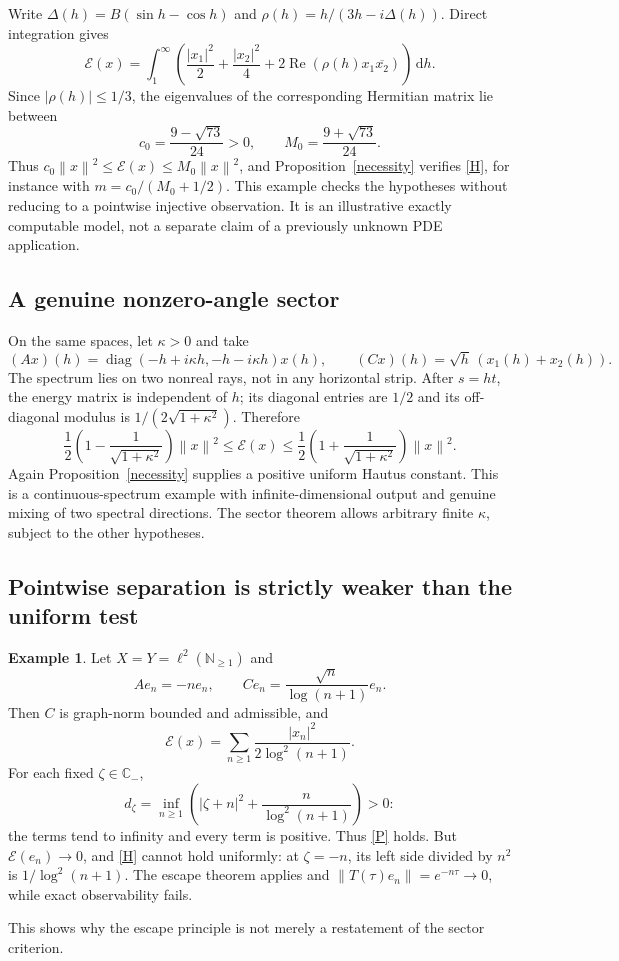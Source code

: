 \documentclass[11pt,a4paper]{article}
\theoremstyle{definition}\newtheorem{definition}[theorem]{Definition}
\newtheorem{example}[theorem]{Example}
\theoremstyle{remark}\newtheorem{remark}[theorem]{Remark}
\newcommand{\C}{\mathbb C}\newcommand{\R}{\mathbb R}\newcommand{\N}{\mathbb N}
\newcommand{\E}{\mathcal E}\newcommand{\D}{\mathcal D}
\newcommand{\dd}{\,\mathrm d}
\DeclareMathOperator{\Rea}{Re}\DeclareMathOperator{\Ima}{Im}
\newcommand{\norm}[1]{\left\lVert #1\right\rVert}
\begin{document}
Write $\Delta(h)=B(\sin h-\cos h)$ and $\rho(h)=h/(3h-i\Delta(h))$. Direct integration gives
\begin{equation}\label{strip-energy}
 \E(x)=\int_1^\infty\left(\frac{|x_1|^2}{2}+\frac{|x_2|^2}{4}
 +2\Rea(\rho(h)x_1\overline{x_2})\right)\dd h.
\end{equation}
Since $|\rho(h)|\le1/3$, the eigenvalues of the corresponding Hermitian matrix lie between
\[
 c_0=\frac{9-\sqrt{73}}{24}>0,
 \qquad M_0=\frac{9+\sqrt{73}}{24}.
\]
Thus $c_0\norm{x}^2\le\E(x)\le M_0\norm{x}^2$, and Proposition~\ref{necessity} verifies \eqref{H}, for instance with $m=c_0/(M_0+1/2)$. This example checks the hypotheses without reducing to a pointwise injective observation. It is an illustrative exactly computable model, not a separate claim of a previously unknown PDE application.

\subsection{A genuine nonzero-angle sector}
On the same spaces, let $\kappa>0$ and take
\[
 (Ax)(h)=\operatorname{diag}(-h+i\kappa h,-h-i\kappa h)x(h),
 \qquad (Cx)(h)=\sqrt h\,(x_1(h)+x_2(h)).
\]
The spectrum lies on two nonreal rays, not in any horizontal strip. After $s=ht$, the energy matrix is independent of $h$; its diagonal entries are $1/2$ and its off-diagonal modulus is $1/(2\sqrt{1+\kappa^2})$. Therefore
\[
 \frac12\left(1-\frac1{\sqrt{1+\kappa^2}}\right)\norm{x}^2
 \le\E(x)\le
 \frac12\left(1+\frac1{\sqrt{1+\kappa^2}}\right)\norm{x}^2.
\]
Again Proposition~\ref{necessity} supplies a positive uniform Hautus constant. This is a continuous-spectrum example with infinite-dimensional output and genuine mixing of two spectral directions. The sector theorem allows arbitrary finite $\kappa$, subject to the other hypotheses.

\subsection{Pointwise separation is strictly weaker than the uniform test}
\begin{example}\label{pointwise-example}
Let $X=Y=\ell^2(\N_{\ge1})$ and
\[
 Ae_n=-ne_n,\qquad Ce_n=\frac{\sqrt n}{\log(n+1)}e_n.
\]
Then $C$ is graph-norm bounded and admissible, and
\[
 \E(x)=\sum_{n\ge1}\frac{|x_n|^2}{2\log^2(n+1)}.
\]
For each fixed $\zeta\in\C_-$,
\[
 d_\zeta=\inf_{n\ge1}\left(|\zeta+n|^2+\frac{n}{\log^2(n+1)}\right)>0:
\]
the terms tend to infinity and every term is positive. Thus \eqref{P} holds. But $\E(e_n)\to0$, and \eqref{H} cannot hold uniformly: at $\zeta=-n$, its left side divided by $n^2$ is $1/\log^2(n+1)$. The escape theorem applies and $\norm{T(\tau)e_n}=e^{-n\tau}\to0$, while exact observability fails.
\end{example}
This shows why the escape principle is not merely a restatement of the sector criterion.
\end{document}
